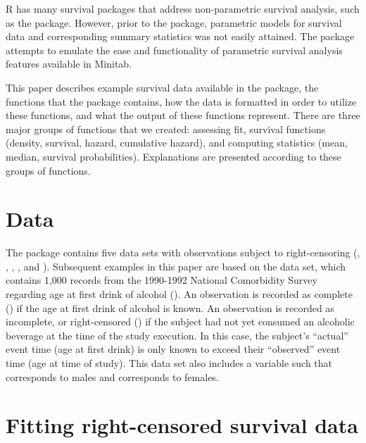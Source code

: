 R has many survival packages that address non-parametric survival
analysis, such as the  package. However, prior to the
 package, parametric models for survival data and
corresponding summary statistics was not easily attained. The
 package attempts to emulate the ease and functionality
of parametric survival analysis features available in Minitab.

This paper describes example survival data available in the
 package, the functions that the package contains, how
the data is formatted in order to utilize these functions, and what the
output of these functions represent. There are three major groups of
functions that we created: assessing fit, survival functions (density,
survival, hazard, cumulative hazard), and computing statistics (mean,
median, survival probabilities). Explanations are presented according to
these groups of functions.

\hypertarget{data}{%
\section{Data}\label{data}}

The  package contains five data sets with observations
subject to right-censoring (, ,
, , and ). Subsequent
examples in this paper are based on the  data set,
which contains 1,000 records from the 1990-1992 National Comorbidity
Survey regarding age at first drink of alcohol (). An
observation is recorded as complete () if the age at
first drink of alcohol is known. An observation is recorded as
incomplete, or right-censored () if the subject had not
yet consumed an alcoholic beverage at the time of the study execution.
In this case, the subject's ``actual'' event time (age at first drink)
is only known to exceed their ``observed'' event time (age at time of
study). This data set also includes a  variable such that
 corresponds to males and  corresponds to females.

\hypertarget{fitting-right-censored-survival-data}{%
\section{Fitting right-censored survival
data}\label{fitting-right-censored-survival-data}}

